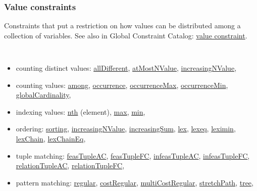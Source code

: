 \subsubsection{Value constraints}\label{model:valueconstraints}\hypertarget{model:valueconstraints}{}
Constraints that put a restriction on how values can be distributed among a collection of variables.
See also in Global Constraint Catalog: \href{http://www.emn.fr/x-info/sdemasse/gccat/Kvalue_constraint.html}{value constraint}.

\vspace{1em}\noindent\begin{notedef}\tt
  \begin{itemize}
  \item counting distinct values: 
\hyperlink{alldifferent:alldifferentconstraint}{allDifferent}, 
\hyperlink{atmostnvalue:atmostnvalueconstraint}{atMostNValue},
\hyperlink{increasingnvalue:increasingnvalueconstraint}{increasingNValue},
  \item counting values: 
\hyperlink{among:amongconstraint}{among},
\hyperlink{occurrence:occurrenceconstraint}{occurrence},
\hyperlink{occurrencemax:occurrencemaxconstraint}{occurrenceMax},
\hyperlink{occurrencemin:occurrenceminconstraint}{occurrenceMin},
\hyperlink{globalcardinality:globalcardinalityconstraint}{globalCardinality},
  \item indexing values: 
\hyperlink{nth:nthconstraint}{nth} (element),
\hyperlink{max:maxconstraint}{max},
\hyperlink{min:minconstraint}{min},
  \item ordering: 
\hyperlink{sorting:sortingconstraint}{sorting},
\hyperlink{increasingnvalue:increasingnvalueconstraint}{increasingNValue},
\hyperlink{increasingsum:increasingsumconstraint}{increasingSum},
\hyperlink{lex:lexconstraint}{lex}, 
\hyperlink{lexeq:lexeqconstraint}{lexeq},
\hyperlink{leximin:leximinconstraint}{leximin},
\hyperlink{lexchain:lexchainconstraint}{lexChain},
\hyperlink{lexchaineq:lexchaineqconstraint}{lexChainEq},
  \item tuple matching: 
\hyperlink{feastupleac:feastupleacconstraint}{feasTupleAC},
\hyperlink{feastuplefc:feastuplefcconstraint}{feasTupleFC},
\hyperlink{infeastupleac:infeastupleacconstraint}{infeasTupleAC},
\hyperlink{infeastuplefc:infeastuplefcconstraint}{infeasTupleFC},
\hyperlink{relationtupleac:relationtupleacconstraint}{relationTupleAC},
\hyperlink{relationtuplefc:relationtuplefcconstraint}{relationTupleFC},
  \item pattern matching: 
\hyperlink{regular:regularconstraint}{regular},
\hyperlink{costregular:costregularconstraint}{costRegular},
\hyperlink{multicostregular:multicostregularconstraint}{multiCostRegular}, 
\hyperlink{stretchpath:stretchpathconstraint}{stretchPath}, 
\hyperlink{tree:treeconstraint}{tree},
  \end{itemize}
\end{notedef}

